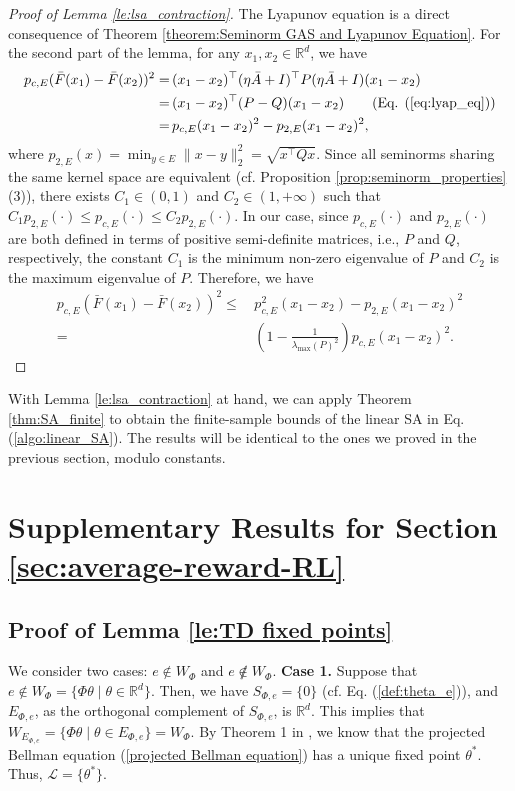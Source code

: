 \documentclass[11 pt]{article}
\begin{document}
	\begin{proof}[Proof of Lemma \ref{le:lsa_contraction}]
		The Lyapunov equation is a direct consequence of Theorem \ref{theorem:Seminorm GAS and Lyapunov Equation}.
		For the second part of the lemma, for any $x_1,x_2\in\mathbb{R}^d$, we have
		\begin{align*}
			p_{c,E}(\bar{F}(x_1)-\bar{F}(x_2))^2=\,&(x_1-x_2)^\top (\eta \bar{A}+I)^\top P(\eta \bar{A}+I) (x_1-x_2)\\
			=\,&(x_1-x_2)^\top (P-Q) (x_1-x_2)\tag{Eq. (\ref{eq:lyap_eq})}\\
			=\,&p_{c,E}(x_1-x_2)^2-p_{2,E}(x_1-x_2)^2,
		\end{align*}
		where $p_{2,E}(x)=\min_{y\in E}\|x-y\|_2^2=\sqrt{x^\top Qx}$.
		Since all seminorms sharing the same kernel space are equivalent (cf. Proposition \ref{prop:seminorm_properties} (3)), there exists $C_1\in (0,1)$ and $C_2\in (1,+\infty)$ such that $C_1p_{2,E}(\cdot)\leq p_{c,E}(\cdot)\leq C_2p_{2,E}(\cdot)$. In our case, since $p_{c,E}(\cdot)$ and $p_{2,E}(\cdot)$ are both defined in terms of positive semi-definite matrices, i.e., $P$ and $Q$, respectively, the constant $C_1$ is the minimum non-zero eigenvalue of $P$ and $C_2$ is the maximum eigenvalue of $P$. Therefore, we have
		\begin{align*}
			p_{c,E}(\bar{F}(x_1)-\bar{F}(x_2))^2\leq \,&p_{c,E}^2(x_1-x_2)-p_{2,E}(x_1-x_2)^2\\
			= \,&\left(1-\frac{1}{\lambda_{\max}(P)^2}\right)p_{c,E}(x_1-x_2)^2.
		\end{align*}
	\end{proof}
	
	With Lemma \ref{le:lsa_contraction} at hand, we can apply Theorem \ref{thm:SA_finite} to obtain the finite-sample bounds of the linear SA in Eq. (\ref{algo:linear_SA}). The results will be identical to the ones we proved in the previous section, modulo constants.
	
	
	\section{Supplementary Results for Section \ref{sec:average-reward-RL}}
	\subsection{Proof of Lemma \ref{le:TD fixed points}}\label{pf:le:TD fixed points} 
	We consider two cases: $e \not \in W_{\Phi}$ and $e \not \notin W_{\Phi}$.
	\textbf{Case 1.} 
	Suppose that $ e \not\in W_{\Phi} =\{\Phi\theta\mid \theta\in\mathbb{R}^d\}$. Then, we have $ S_{\Phi, e} = \{0\} $ (cf. Eq. (\ref{def:theta_e})), and $ E_{\Phi, e} $, as the orthogonal complement of $ S_{\Phi, e} $, is $\mathbb{R}^d$. This implies that $ W_{E_{\Phi, e}} = \{\Phi \theta \mid \theta \in E_{\Phi, e}\} = W_{\Phi} $. By Theorem 1 in \cite{tsitsiklis1999average}, we know that the projected Bellman equation (\ref{projected Bellman equation}) has a unique fixed point $\theta^*$. Thus, $\mathcal{L} = \{\theta^*\}$.
	
\end{document}
